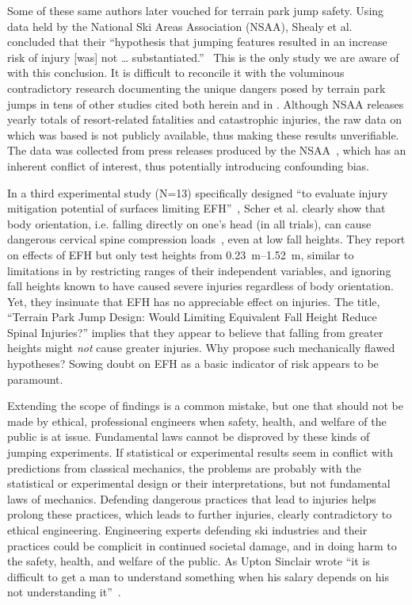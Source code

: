 \documentclass[fleqn,10pt,lineno]{wlpeerj}
\begin{document}
Some of these same authors later vouched for terrain park jump safety. Using
data held by the National Ski Areas Association (NSAA), Shealy et
al.~\citep{Shealy2015} concluded that their ``hypothesis that jumping features
resulted in an increase risk of injury [was] not \ldots
substantiated.''~\citep{Shealy2015} This is the only study we are aware of with
this conclusion. It is difficult to reconcile it with the voluminous
contradictory research documenting the unique dangers posed by terrain park
jumps in tens of other studies cited both herein and in
\citep{Hubbard2009,Swedberg2012,McNeil2012,McNeil2012a,Hubbard2015,Levy2015,Petrone2017,Moore2018}.
Although NSAA releases yearly totals of resort-related fatalities and
catastrophic injuries, the raw data on which \cite{Shealy2015} was based is not
publicly available, thus making these results unverifiable. The data was
collected from press releases produced by the NSAA~\citep{Shealy2015}, which
has an inherent conflict of interest, thus potentially introducing confounding
bias.

In a third experimental study (N=13) specifically designed ``to evaluate injury
mitigation potential of surfaces limiting EFH''~\citep{Scher2015}, Scher et al.
clearly show that body orientation, i.e. falling directly on one's head (in all
trials), can cause dangerous cervical spine compression
loads~\citep{Scher2015}, even at low fall heights. They report on effects of
EFH but only test heights from \SIrange{0.23}{1.52}{\meter},  similar to
limitations in \cite{Shealy2010} by restricting ranges of their independent
variables, and ignoring fall heights known to have caused severe injuries
regardless of body orientation. Yet, they insinuate that EFH has no appreciable
effect on injuries.  The title, ``Terrain Park Jump Design: Would Limiting
Equivalent Fall Height Reduce Spinal Injuries?'' implies that they appear to
believe that falling from greater heights might \emph{not} cause greater
injuries. Why propose such mechanically flawed hypotheses? Sowing doubt on EFH
as a basic indicator of risk appears to be paramount.

Extending the scope of findings is a common mistake, but one that should not be
made by ethical, professional engineers when safety, health, and welfare of the
public is at issue. Fundamental laws cannot be disproved by these kinds of
jumping experiments. If statistical or experimental results seem in conflict
with predictions from classical mechanics, the problems are probably with the
statistical or experimental design or their interpretations, but not
fundamental laws of mechanics. Defending dangerous practices that lead to
injuries helps prolong these practices, which leads to further injuries,
clearly contradictory to ethical engineering. Engineering experts defending ski
industries and their practices could be complicit in continued societal damage,
and in doing harm to the safety, health, and welfare of the public. As Upton
Sinclair wrote ``it is difficult to get a man to understand something when his
salary depends on his not understanding it''~\citep{Sinclair1994}.
\end{document}

